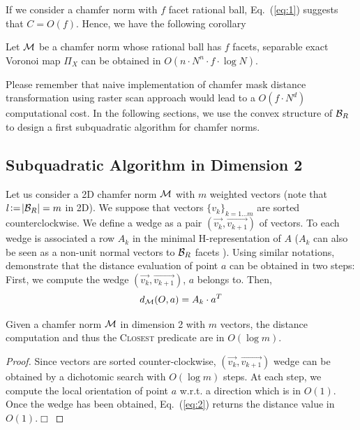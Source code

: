 \documentclass{llncs}
\begin{document}
If we consider a chamfer norm with $f$ facet rational ball, Eq.~(\ref{eq:1})
suggests that $C=O(f)$. Hence, we have the following corollary
\begin{corollary}
  Let $\mathcal{M}$ be a chamfer norm whose rational ball has $f$ facets,
  separable exact Voronoi map $\Pi_X$ can be obtained in
    $O(n\cdot N^n\cdot f \cdot \log{N})$.
\end{corollary}

Please remember that naive implementation of chamfer mask distance
transformation using raster scan approach would lead to a $O(f\cdot
N^d)$ computational cost. In the following sections, we use the convex
structure of $\mathcal{B}_R$ to design a first subquadratic algorithm for chamfer
norms.

\subsection{Subquadratic Algorithm in Dimension 2}
\label{sec:subq-algor-dimens}

Let us consider a 2D chamfer norm $\mathcal{M}$ with $m$ weighted vectors (note
that $l\!\mathrel{\mathop:}=\!|\mathcal{B}_R| = m$ in 2D). We suppose that vectors
$\{v_k\}_{k=1\ldots m}$ are sorted counterclockwise. We define a wedge
as a pair $(\vec{v_k},\vec{v_{k+1}})$ of vectors. To each wedge is
associated a row $A_k$ in the minimal H-representation of $A$ ($A_k$
can also be seen as a non-unit normal vectors to $\mathcal{B}_R$ facets
\cite{DBLP:journals/pr/NormandE09}). Using similar notations,
\cite{Thiel_hdr,Strand2008} demonstrate that the distance evaluation
of point $a$ can be obtained in two steps: First, we compute the wedge
$(\vec{v_k},\vec{v_{k+1}})$, $a$ belongs to. Then,
\begin{equation}
\label{eq:2}
  d_{\mathcal{M}}(O,a) = A_k\cdot a^T
\end{equation}

\begin{lemma}
\label{lem:log}
  Given a chamfer norm $\mathcal{M}$ in dimension 2 with $m$ vectors, the distance computation
  and thus the \textsc{Closest} predicate are in $O(\log{m})$.
\end{lemma}
\begin{proof}
  Since vectors are sorted counter-clockwise,
  $(\vec{v_k},\vec{v_{k+1}})$ wedge can be obtained by a dichotomic
  search with $O(\log{m})$ steps. At each step, we compute the local
  orientation of point $a$ w.r.t. a direction which is in $O(1)$. Once
  the wedge has been obtained, Eq.~(\ref{eq:2}) returns the distance
  value in $O(1)$.$\Box$
\end{proof}
\end{document}
